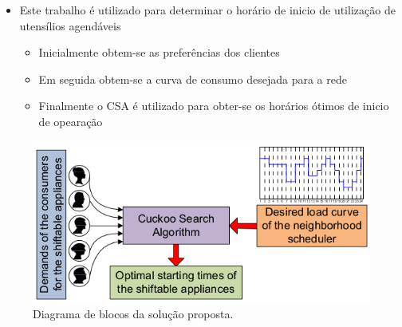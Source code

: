 \begin{frame}
  \begin{block}{}
    \begin{itemize}
      \item Este trabalho é utilizado para determinar o horário de inicio de
      utilização de \alert{utensílios agendáveis}
      \begin{itemize}
        \item Inicialmente obtem-se as preferências dos clientes
        \item Em seguida obtem-se a curva de consumo desejada para a rede
        \item Finalmente o CSA é utilizado para obter-se os horários ótimos de
        inicio de opearação
      \end{itemize}
    \end{itemize}
  \end{block}
  \begin{figure}[h]
  	\begin{center}
      \includegraphics [scale=0.35]{./Figures/CSscheme}
      \caption {Diagrama de blocos da solução proposta.}
  	\end{center}
  \end{figure}
\end{frame}



